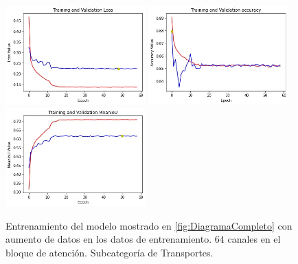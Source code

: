 \begin{figure}[htpb]
  \centering
  \includegraphics[width=0.48\textwidth]{../../modelos-entrenados/unet-nonlocal/ejecucion4/loss}
  \includegraphics[width=0.48\textwidth]{../../modelos-entrenados/unet-nonlocal/ejecucion4/acc}
  \includegraphics[width=0.48\textwidth]{../../modelos-entrenados/unet-nonlocal/ejecucion4/iou}
  \caption{Entrenamiento del modelo mostrado en \autoref{fig:DiagramaCompleto} con aumento de datos en los datos de entrenamiento. $64$ canales en el bloque de atención. Subcategoría de Transportes.}
  \label{fig:ejec4}
\end{figure}

